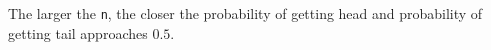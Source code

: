 
The larger the \texttt{n}, the closer the probability of getting head
and probability of getting tail approaches $0.5$.
